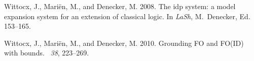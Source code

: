 \documentclass{tlp}
\renewcommand{\|}{\ensuremath{\,|\,}}
\renewcommand{\|}{\,|\,}
\begin{document}
\begin{thebibliography}{}
{\sc Wittocx, J.}, {\sc Mari\"en, M.}, {\sc and} {\sc Denecker, M.} 2008.
\newblock The {\sc idp} system: a model expansion system for an extension of
  classical logic.
\newblock In {\em LaSh}, {M.~Denecker}, Ed. 153--165.

{\sc Wittocx, J.}, {\sc Mari{\"e}n, M.}, {\sc and} {\sc Denecker, M.} 2010.
\newblock Grounding {FO} and {FO(ID)} with bounds.
~{\em 38},
  223--269.

\end{thebibliography}
\end{document}
